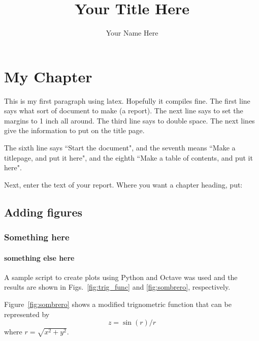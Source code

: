 \documentclass{report}
\author{Your Name Here}
\title{Your Title Here}
\begin{document}
\maketitle



\chapter{My Chapter}

This is my first paragraph using latex. Hopefully it compiles fine. The first line says what sort of document to make (a report). The next line says to set the margins to 1 inch all around. The third line says to double space.
The next lines give the information to put on the title page.

The sixth line says ``Start the document", and the seventh means ``Make a titlepage, and put it here", and the eighth ``Make a table of contents, and put it here".

Next, enter the text of your report. Where you want a chapter heading, put:

\section{Adding figures}
\subsection{Something here}
\subsubsection{something else here}
A sample script to create plots using Python and Octave was used and the results are shown in Figs.~\ref{fig:trig_func} and \ref{fig:sombrero}, respectively.

%
%

\begin{figure}[!h]
\centering
{}
\label{fig:sample_plots}
\end{figure}

Figure~\ref{fig:sombrero} shows a modified trignometric function that can be represented by
\begin{equation} %
z = \sin(r)/r
\end{equation}
where $r = \sqrt{x^2+y^2}$.
\end{document}
